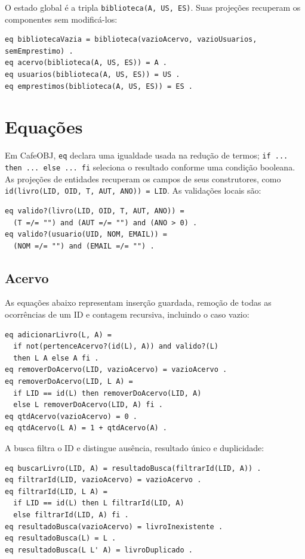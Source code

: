 \documentclass[a4paper,12pt]{article}
\begin{document}
O estado global é a tripla \texttt{biblioteca(\allowbreak{}A,\allowbreak{} US,\allowbreak{} ES)}. Suas projeções
recuperam os componentes sem modificá-los:
\begin{lstlisting}
eq bibliotecaVazia = biblioteca(vazioAcervo, vazioUsuarios, semEmprestimo) .
eq acervo(biblioteca(A, US, ES)) = A .
eq usuarios(biblioteca(A, US, ES)) = US .
eq emprestimos(biblioteca(A, US, ES)) = ES .
\end{lstlisting}

\section{Equações}

Em CafeOBJ, \texttt{eq} declara uma igualdade usada na redução de termos;
\texttt{if ... then ... else ... fi} seleciona o resultado conforme uma
condição booleana. As projeções de entidades recuperam os campos de seus
construtores, como \texttt{id(\allowbreak{}livro(\allowbreak{}LID,\allowbreak{} OID,\allowbreak{} T,\allowbreak{} AUT,\allowbreak{} ANO)) = LID}.
As validações locais são:
\begin{lstlisting}
eq valido?(livro(LID, OID, T, AUT, ANO)) =
  (T =/= "") and (AUT =/= "") and (ANO > 0) .
eq valido?(usuario(UID, NOM, EMAIL)) =
  (NOM =/= "") and (EMAIL =/= "") .
\end{lstlisting}

\subsection{Acervo}

As equações abaixo representam inserção guardada, remoção de todas as
ocorrências de um ID e contagem recursiva, incluindo o caso vazio:
\begin{lstlisting}
eq adicionarLivro(L, A) =
  if not(pertenceAcervo?(id(L), A)) and valido?(L)
  then L A else A fi .
eq removerDoAcervo(LID, vazioAcervo) = vazioAcervo .
eq removerDoAcervo(LID, L A) =
  if LID == id(L) then removerDoAcervo(LID, A)
  else L removerDoAcervo(LID, A) fi .
eq qtdAcervo(vazioAcervo) = 0 .
eq qtdAcervo(L A) = 1 + qtdAcervo(A) .
\end{lstlisting}

A busca filtra o ID e distingue ausência, resultado único e duplicidade:
\begin{lstlisting}
eq buscarLivro(LID, A) = resultadoBusca(filtrarId(LID, A)) .
eq filtrarId(LID, vazioAcervo) = vazioAcervo .
eq filtrarId(LID, L A) =
  if LID == id(L) then L filtrarId(LID, A)
  else filtrarId(LID, A) fi .
eq resultadoBusca(vazioAcervo) = livroInexistente .
eq resultadoBusca(L) = L .
eq resultadoBusca(L L' A) = livroDuplicado .
\end{lstlisting}
\end{document}
